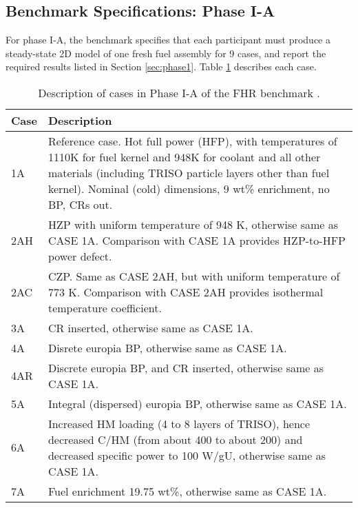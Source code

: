 \subsection{Benchmark Specifications: Phase I-A}
For phase I-A, the benchmark specifies that each participant must produce a 
steady-state 2D model of one fresh fuel assembly for 9 cases, 
and report the required results listed in Section \ref{sec:phase1}.  
Table \ref{tab:phase1a-cases} describes each case. 
\begin{table}[H]
    \centering
    \onehalfspacing
    \caption{Description of cases in Phase I-A of the \gls{FHR} benchmark \cite{noauthor_fluoride_nodate}.}
	\label{tab:phase1a-cases}
    \footnotesize
    \begin{tabular}{p{}|p{}}
    \hline 
    \textbf{Case} & \textbf{Description} \\
    \hline
    1A & Reference case. Hot full power (HFP), with temperatures of 1110K for 
    fuel kernel and 948K for coolant and all other materials (including TRISO 
    particle layers other than fuel kernel). Nominal (cold) dimensions, 
    9 wt\% enrichment, no \gls{BP}, \glspl{CR} out.\\
    \hline
    2AH & \gls{HZP} with uniform temperature of 948 K, 
    otherwise same as CASE 1A. Comparison with CASE 1A provides HZP-to-HFP power 
    defect.\\
    \hline 
    2AC & \gls{CZP}. Same as CASE 2AH, but with uniform temperature 
    of 773 K. Comparison with CASE 2AH provides isothermal temperature coefficient.\\
    \hline
    3A & \gls{CR} inserted, otherwise same as CASE 1A. \\
    \hline
    4A & Disrete europia \gls{BP}, otherwise same as CASE 1A.\\
    \hline
    4AR & Discrete europia \gls{BP}, and \gls{CR} inserted, otherwise same as 
    CASE 1A. \\
    \hline
    5A & Integral (dispersed) europia \gls{BP}, otherwise same as CASE 1A. \\
    \hline
    6A & Increased \gls{HM} loading (4 to 8 layers of \gls{TRISO}), hence decreased C/HM 
    (from about 400 to about 200) and decreased specific power to 100 W/gU, 
    otherwise same as CASE 1A.\\
    \hline 
    7A & Fuel enrichment 19.75 wt\%, otherwise same as CASE 1A.\\
    \hline 
    \end{tabular}
\end{table}


